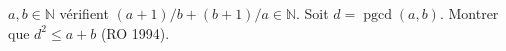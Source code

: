 $a, b \in \mathbb{N}$ vérifient $(a + 1)/b + (b + 1)/a \in \mathbb{N}$. Soit $d = \operatorname{pgcd}(a, b)$. Montrer que $d^2 \leq a + b$ (RO 1994).
